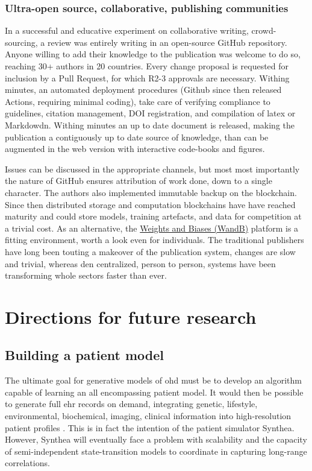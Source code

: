 \subsubsection{Ultra-open source, collaborative, publishing communities}
In a successful and educative experiment on collaborative writing, crowd-sourcing, a review was entirely writing in an open-source GitHub repository. Anyone willing to add their knowledge to the publication was welcome to do so, reaching 30+ authors in 20 countries. Every change proposal is requested for inclusion by a Pull Request, for which R2-3 approvals are necessary. Withing minutes, an automated deployment procedures (Github since then released Actions, requiring minimal coding), take care of verifying compliance to guidelines, citation management, DOI registration, and compilation of latex or Markdowdn. Withing minutes an up to date document is released, making the publication a contiguously up to date source of knowledge, than can be augmented in the web version with interactive code-books and figures.\par
Issues can be discussed in the appropriate channels, but most most importantly the nature of GitHub ensures attribution of work done, down to a single character. The authors also implemented immutable backup on the blockchain. Since then distributed storage and computation blockchains have have reached maturity and could store models, training artefacts, and data for competition at a trivial cost. As an alternative,  the \href{http://bit.ly/WandB-ML}{Weights and Biases (WandB)} platform is a fitting environment, worth a look even for individuals. The traditional publishers have long been touting a makeover of the publication system, changes are slow and trivial, whereas den centralized, person to person, systems have been transforming whole sectors faster than ever.\\

\section{Directions for future research}
\subsection{Building a patient model}
The ultimate goal for generative models of \gls{ohd} must be to develop an algorithm capable of learning an all encompassing patient model. It would then be possible to generate full \gls{ehr} records on demand, integrating genetic, lifestyle, environmental, biochemical, imaging, clinical information into high-resolution patient profiles \cite{Capobianco2020}. This is in fact the intention of the patient simulator Synthea. However, Synthea will eventually face a problem with scalability and the capacity of semi-independent state-transition models to coordinate in capturing long-range correlations.\par

